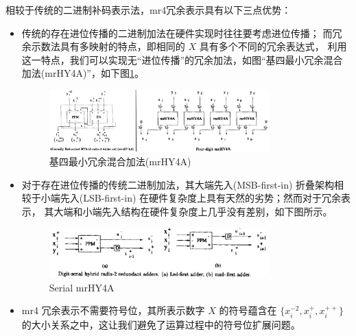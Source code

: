 相较于传统的二进制补码表示法，mr4冗余表示具有以下三点优势：
\begin{itemize}
    \item   传统的存在进位传播的二进制加法在硬件实现时往往要考虑进位传播；
            而冗余示数法具有多映射的特点，即相同的 $X$ 具有多个不同的冗余表达式，
            利用这一特点，我们可以实现无``进位传播''的冗余加法，如图``基四最小冗余混合加法(mrHY4A)''，如下图\ref{fig:mrHY4A}。
            \begin{center}
                \begin{figure}[ht!]
                    \centering
                    \includegraphics[width=0.8\textwidth]{figures/mrHY4A.png}
                    \caption{基四最小冗余混合加法(mrHY4A)}
                    \label{fig:mrHY4A}
                \end{figure}
            \end{center}
    \item   对于存在进位传播的传统二进制加法，其大端先入(MSB-first-in)
            折叠架构相较于小端先入(LSB-first-in)
            在硬件复杂度上具有天然的劣势；然而对于冗余表示，
            其大端和小端先入结构在硬件复杂度上几乎没有差别，如下图所示。
            \begin{center}
                \begin{figure}[ht!]
                    \centering
                    \includegraphics[width=0.8\textwidth]{figures/serial_mrHY4A.png}
                    \caption{Serial mrHY4A}
                    \label{fig:serial-mrHY4A}
                \end{figure}
            \end{center}
    \item   mr4 冗余表示不需要符号位，其所表示数字 $X$ 的符号蕴含在 
            $\{x_i^{-2},x_i^{+},x_i^{++}\}$ 的大小关系之中，这让我们避免了运算过程中的符号位扩展问题。
\end{itemize}

